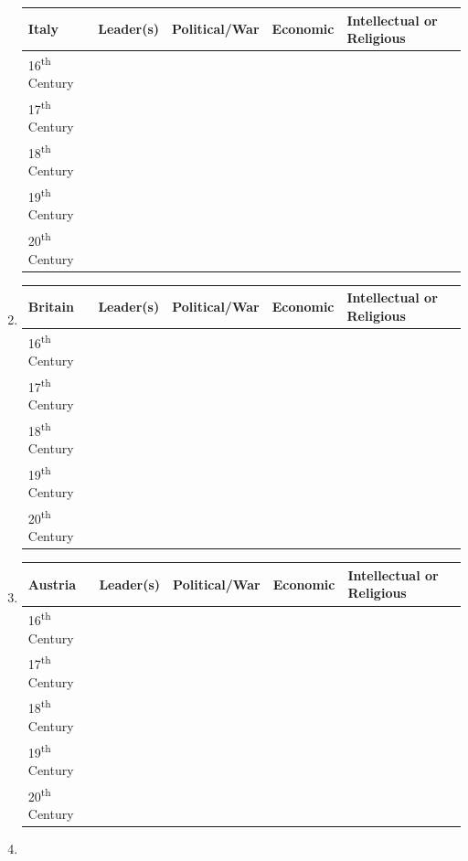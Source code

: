 \documentclass[12pt]{article}
\begin{document}
\begin{enumerate}
\begin{tabular}{p{} p{} p{} p{} p{}}
Italy & Leader(s) & Political/War & Economic & Intellectual or Religious \\
\hline
16\textsuperscript{th} Century & & & & \\
\hline
17\textsuperscript{th} Century & & & & \\
\hline
18\textsuperscript{th} Century & & & & \\
\hline
19\textsuperscript{th} Century & & & & \\
\hline
20\textsuperscript{th} Century & & & & \\

\end{tabular}

\item \begin{tabular}{p{} p{} p{} p{} p{}}

Britain & Leader(s) & Political/War & Economic & Intellectual or Religious \\
\hline
16\textsuperscript{th} Century & & & & \\
\hline
17\textsuperscript{th} Century & & & & \\
\hline
18\textsuperscript{th} Century & & & & \\
\hline
19\textsuperscript{th} Century & & & & \\
\hline
20\textsuperscript{th} Century & & & & \\

\end{tabular}

\item \begin{tabular}{p{} p{} p{} p{} p{}}

Austria & Leader(s) & Political/War & Economic & Intellectual or Religious \\
\hline
16\textsuperscript{th} Century & & & & \\
\hline
17\textsuperscript{th} Century & & & & \\
\hline
18\textsuperscript{th} Century & & & & \\
\hline
19\textsuperscript{th} Century & & & & \\
\hline
20\textsuperscript{th} Century & & & & \\

\end{tabular}

\item \begin{tabular}{p{} p{} p{} p{} p{}}


\end{tabular}
\end{enumerate}
\end{document}
